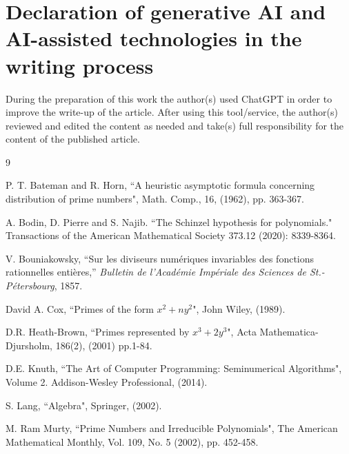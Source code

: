 \documentclass[a4paper,11pt]{article}
\begin{document}
	\section*{Declaration of generative AI and AI-assisted technologies in the writing process}
	
	During the preparation of this work the author(s) used ChatGPT in order to improve the write-up of the article. After using this tool/service, the author(s) reviewed and edited the content as needed and take(s) full responsibility for the content of the published article.
	
	
	\begin{thebibliography}{9}
		
		 P. T. Bateman and R. Horn, ``A heuristic asymptotic formula concerning distribution of prime numbers", Math. Comp., 16, (1962), pp. 363-367.
		
		 A. Bodin, D. Pierre and S. Najib. ``The Schinzel hypothesis for polynomials." Transactions of the American Mathematical Society 373.12 (2020): 8339-8364.
		
		 V. Bouniakowsky, ``Sur les diviseurs num\'eriques invariables des fonctions rationnelles enti\`eres,'' \textit{Bulletin de l'Acad\'emie Imp\'eriale des Sciences de St.-P\'etersbourg}, 1857.
		
		
		 David A. Cox, ``Primes of the form $x^2+ny^2$", John Wiley, (1989).
		
		 D.R. Heath-Brown, ``Primes represented by $x^3+ 2y^3$", Acta Mathematica-Djursholm, 186(2), (2001) pp.1-84.
		
		 D.E. Knuth, ``The Art of Computer Programming: Seminumerical Algorithms", Volume 2. Addison-Wesley Professional, (2014).
		
		 S. Lang, ``Algebra", Springer, (2002).
		
		 M. Ram Murty, ``Prime Numbers and Irreducible Polynomials", The American Mathematical Monthly, Vol. 109, No. 5 (2002), pp. 452-458.
		
	\end{thebibliography}
	
\end{document}

